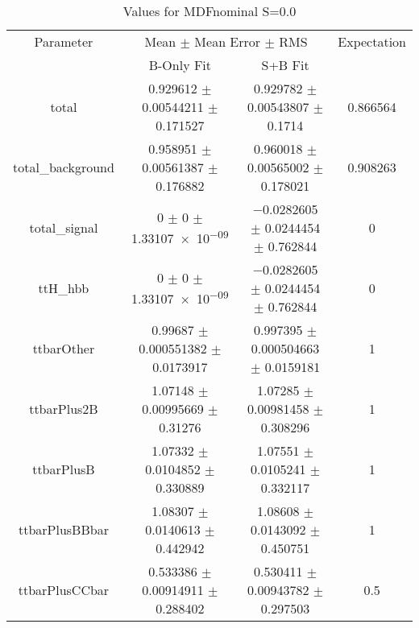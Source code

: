 \begin{table}
\centering
\caption{Values for MDFnominal S=0.0}
\begin{tabular}{cccc}
\toprule
Parameter & \multicolumn{2}{c}{Mean $\pm$ Mean Error $\pm$ RMS} & Expectation\\
 & B-Only Fit & S+B Fit & \\
\midrule
total & \num{0.929612} $\pm$ \num{0.00544211} $\pm$ \num{0.171527} & \num{0.929782} $\pm$ \num{0.00543807} $\pm$ \num{0.1714} & \num{0.866564}\\
total\_background & \num{0.958951} $\pm$ \num{0.00561387} $\pm$ \num{0.176882} & \num{0.960018} $\pm$ \num{0.00565002} $\pm$ \num{0.178021} & \num{0.908263}\\
total\_signal & \num{0} $\pm$ \num{0} $\pm$ \num{1.33107e-09} & \num{-0.0282605} $\pm$ \num{0.0244454} $\pm$ \num{0.762844} & \num{0}\\
ttH\_hbb & \num{0} $\pm$ \num{0} $\pm$ \num{1.33107e-09} & \num{-0.0282605} $\pm$ \num{0.0244454} $\pm$ \num{0.762844} & \num{0}\\
ttbarOther & \num{0.99687} $\pm$ \num{0.000551382} $\pm$ \num{0.0173917} & \num{0.997395} $\pm$ \num{0.000504663} $\pm$ \num{0.0159181} & \num{1}\\
ttbarPlus2B & \num{1.07148} $\pm$ \num{0.00995669} $\pm$ \num{0.31276} & \num{1.07285} $\pm$ \num{0.00981458} $\pm$ \num{0.308296} & \num{1}\\
ttbarPlusB & \num{1.07332} $\pm$ \num{0.0104852} $\pm$ \num{0.330889} & \num{1.07551} $\pm$ \num{0.0105241} $\pm$ \num{0.332117} & \num{1}\\
ttbarPlusBBbar & \num{1.08307} $\pm$ \num{0.0140613} $\pm$ \num{0.442942} & \num{1.08608} $\pm$ \num{0.0143092} $\pm$ \num{0.450751} & \num{1}\\
ttbarPlusCCbar & \num{0.533386} $\pm$ \num{0.00914911} $\pm$ \num{0.288402} & \num{0.530411} $\pm$ \num{0.00943782} $\pm$ \num{0.297503} & \num{0.5}\\
\bottomrule
\end{tabular}
\end{table}